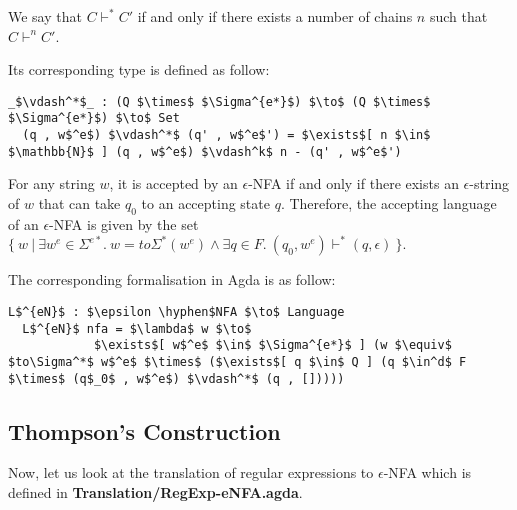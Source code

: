 \begin{defn}
\noindent We say that \(C \vdash^* C'\) if and only
if there exists a number of chains \(n\) such that \(C \vdash^n C'\). 
\end{defn}

\par Its corresponding type is defined as follow: 
\begin{lstlisting}[mathescape=true,xleftmargin=.3\textwidth]
  _$\vdash^*$_ : (Q $\times$ $\Sigma^{e*}$) $\to$ (Q $\times$ $\Sigma^{e*}$) $\to$ Set
  (q , w$^e$) $\vdash^*$ (q' , w$^e$') = $\exists$[ n $\in$ $\mathbb{N}$ ] (q , w$^e$) $\vdash^k$ n - (q' , w$^e$')
\end{lstlisting}

\begin{defn}
\label{defn:enfa}
\noindent For any string \(w\), it is accepted by an \(\epsilon\)-NFA
if and only if there exists an \(\epsilon\)-string of \(w\)
that can take \(q_0\) to an accepting state \(q\). Therefore, the
accepting language of an \(\epsilon\)-NFA is given by the set \(\{\ w\ |\ \exists w^e\in
\Sigma^{e*}.\ w = to\Sigma^*(w^e) \wedge \exists q\in F.\ (q_0,w^e) \vdash^* (q,\epsilon)\ \}\). 
\end{defn}

\par The corresponding formalisation in Agda is as follow: 
\begin{lstlisting}[mathescape=true,xleftmargin=.3\textwidth]
  L$^{eN}$ : $\epsilon \hyphen$NFA $\to$ Language
  L$^{eN}$ nfa = $\lambda$ w $\to$ 
            $\exists$[ w$^e$ $\in$ $\Sigma^{e*}$ ] (w $\equiv$ $to\Sigma^*$ w$^e$ $\times$ ($\exists$[ q $\in$ Q ] (q $\in^d$ F $\times$ (q$_0$ , w$^e$) $\vdash^*$ (q , []))))
\end{lstlisting} 


\subsection{Thompson's Construction}
\par Now, let us look at the translation of regular expressions to
\(\epsilon\)-NFA which is defined in \textbf{Translation/RegExp-eNFA.agda}. 

